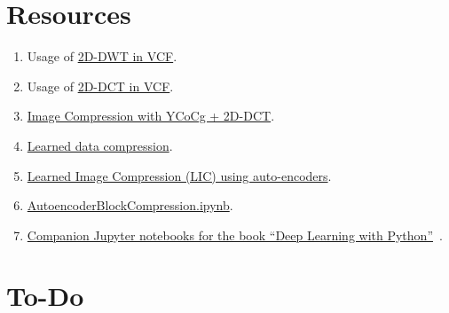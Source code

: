 \section{Resources}

\begin{enumerate}
\item Usage of \href{https://github.com/Sistemas-Multimedia/VCF/blob/main/notebooks/2D-DWT.ipynb}{2D-DWT in VCF}.
\item Usage of \href{https://github.com/Sistemas-Multimedia/VCF/blob/main/notebooks/2D-DCT.ipynb}{2D-DCT in VCF}.
\item
  \href{https://github.com/vicente-gonzalez-ruiz/DCT2D/blob/master/src/DCT2D/YCoCg_2D_DCT_SQ.ipynb}{Image
    Compression with YCoCg + 2D-DCT}.
\item
  \href{https://www.tensorflow.org/tutorials/generative/data_compression}{Learned
    data compression}.
\item
  \href{https://github.com/vicente-gonzalez-ruiz/learned_image_compression/blob/main/notebooks/LIC.ipynb}{Learned
    Image Compression (LIC) using auto-encoders}.
\item
  \href{https://github.com/vicente-gonzalez-ruiz/learned_image_compression/blob/main/notebooks/AutoencoderBlockCompression.ipynb}{AutoencoderBlockCompression.ipynb}.
\item
  \href{https://github.com/fchollet/deep-learning-with-python-notebooks}{Companion
    Jupyter notebooks for the book ``Deep Learning with
    Python''}~\cite{chollet2021deep}.
\end{enumerate}


\section*{To-Do}

